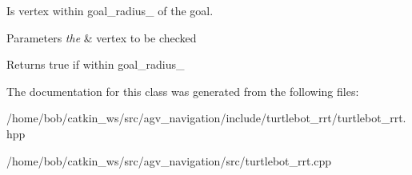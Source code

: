 Is vertex within goal\+\_\+radius\+\_\+ of the goal. 


\begin{DoxyParams}{Parameters}
{\em the} & vertex to be checked \\
\hline
\end{DoxyParams}
\begin{DoxyReturn}{Returns}
true if within goal\+\_\+radius\+\_\+ 
\end{DoxyReturn}


The documentation for this class was generated from the following files\+:\begin{DoxyCompactItemize}
\item 
/home/bob/catkin\+\_\+ws/src/agv\+\_\+navigation/include/turtlebot\+\_\+rrt/turtlebot\+\_\+rrt.\+hpp\item 
/home/bob/catkin\+\_\+ws/src/agv\+\_\+navigation/src/turtlebot\+\_\+rrt.\+cpp\end{DoxyCompactItemize}
